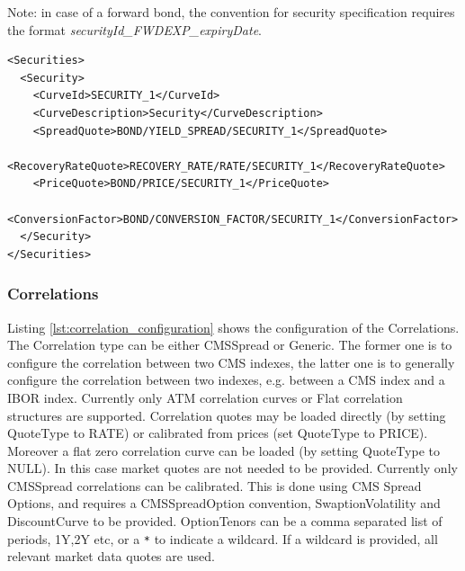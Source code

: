 Note: in case of a forward bond, the convention for security specification requires the format \emph{securityId\_FWDEXP\_expiryDate}.

\begin{longlisting}
\begin{verbatim}
<Securities>
  <Security>
    <CurveId>SECURITY_1</CurveId>
    <CurveDescription>Security</CurveDescription>
    <SpreadQuote>BOND/YIELD_SPREAD/SECURITY_1</SpreadQuote>
    <RecoveryRateQuote>RECOVERY_RATE/RATE/SECURITY_1</RecoveryRateQuote>
    <PriceQuote>BOND/PRICE/SECURITY_1</PriceQuote>
    <ConversionFactor>BOND/CONVERSION_FACTOR/SECURITY_1</ConversionFactor>
  </Security>
</Securities>
\end{verbatim}
\caption{Security Configuration}
\label{lst:security_configuration}
\end{longlisting}

\subsubsection{Correlations}

Listing \ref{lst:correlation_configuration} shows the configuration of the Correlations. The Correlation type can be either CMSSpread or Generic. The former one is to configure the correlation between two CMS indexes, the latter one is to  generally configure the correlation between two indexes, e.g. between a CMS index and a IBOR index. Currently only ATM correlation curves or Flat correlation structures are supported. Correlation quotes may be loaded directly (by setting QuoteType to RATE) or calibrated from prices (set QuoteType to PRICE).  Moreover a flat zero correlation curve can be loaded (by setting  QuoteType to NULL). In this case market quotes are not needed to be provided. Currently only CMSSpread correlations can be calibrated. This is done using CMS Spread Options, and requires a CMSSpreadOption convention, SwaptionVolatility and DiscountCurve to be provided. OptionTenors can be a comma separated list of periods, 1Y,2Y etc, or a \lstinline!*! to indicate a wildcard. If a wildcard is provided, all relevant market data quotes are used.

